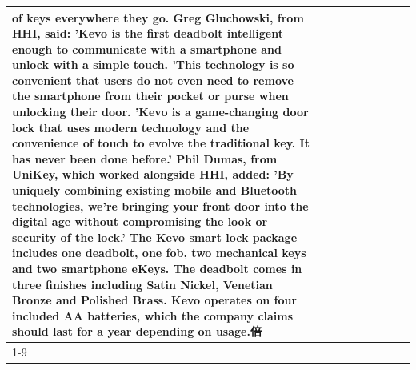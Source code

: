 \begin{table}[H]
\begin{tabular}{lllrlllll}
of keys everywhere they go. Greg Gluchowski, from HHI, said: 'Kevo is the first deadbolt intelligent enough to communicate with a smartphone and unlock with a simple touch. 'This technology is so convenient that users do not even need to remove the smartphone from their pocket or purse when unlocking their door. 'Kevo is a game-changing door lock that uses modern technology and the convenience of touch to evolve the traditional key. It has never been done before.' Phil Dumas, from UniKey, which worked alongside HHI, added: 'By uniquely combining existing mobile and Bluetooth technologies, we’re bringing your front door into the digital age without compromising the look or security of the lock.' The Kevo smart lock package includes one deadbolt, one fob, two mechanical keys and two smartphone eKeys. The deadbolt comes in three finishes including Satin Nickel, Venetian Bronze and Polished Brass. Kevo operates on four included AA batteries, which the company claims should last for a year depending on usage.倍 \\
\cline{1-9}

\end{tabular}
\end{table}
